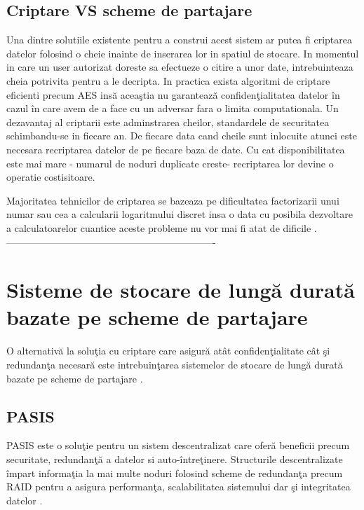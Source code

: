 \documentclass{llncs}
\newcommand{\todo}[1]{{\color{red}{TODO #1}}}
\begin{document}
\subsection{Criptare VS scheme de partajare}


Una dintre solutiile existente pentru a construi acest sistem ar putea fi criptarea datelor folosind o cheie inainte de inserarea lor in spatiul de stocare. In momentul in care un user autorizat doreste sa efectueze o citire a unor date, intrebuinteaza cheia potrivita pentru a le decripta.
In practica exista algoritmi de criptare eficienti precum AES ins\u{a} acea\c{s}tia nu garanteaz\u{a} confiden\c{t}ialitatea datelor \^{i}n cazul \^{i}n care avem de a face cu un adversar fara o limita computationala. Un dezavantaj al criptarii este adminstrarea cheilor, standardele de securitatea schimbandu-se in fiecare an.
De fiecare data cand cheile sunt inlocuite atunci este necesara recriptarea datelor de pe fiecare baza de date. Cu cat disponibilitatea este mai mare - numarul de noduri duplicate creste- recriptarea lor devine o operatie costisitoare. 

Majoritatea tehnicilor de criptarea se bazeaza pe dificultatea factorizarii unui numar sau cea a calcularii logaritmului discret insa o data cu posibila dezvoltare a calculatoarelor cuantice aceste probleme nu vor mai fi atat de dificile \cite{Shor:1994}.
----------------------------------------------------------------



\section{Sisteme de stocare de lung\u{a} durat\u{a} bazate pe scheme de partajare}

O alternativ\u{a} la solu\c{t}ia cu criptare care asigur\u{a} at\^{a}t confiden\c{t}ialitate c\^{a}t \c{s}i redundan\c{t}a necesar\u{a} este intrebuin\c{t}area sistemelor de stocare de lung\u{a} durat\u{a} bazate pe scheme de partajare \cite{W:2000,SB:2005,SGMV:2009}.


\subsection{PASIS}
\label{sec:desc_pasis}
PASIS este o solu\c{t}ie pentru un sistem descentralizat care ofer\u{a} beneficii precum securitate, redundan\c{t}\u{a} a datelor si auto-\^{i}ntre\c{t}inere.
Structurile descentralizate \^{i}mpart informa\c{t}ia la mai multe noduri folosind scheme de redundan\c{t}a precum RAID \todo{(R... A... I... D...) - mereu trebuie in paranteza denumirea completa, o singura data, cand se introduce o abreviere} pentru a asigura performan\c{t}a, scalabilitatea sistemului dar \c{s}i integritatea datelor \cite{Patterson:1988}.
\todo{exact, cateva detalii despre RAID}
\end{document}
